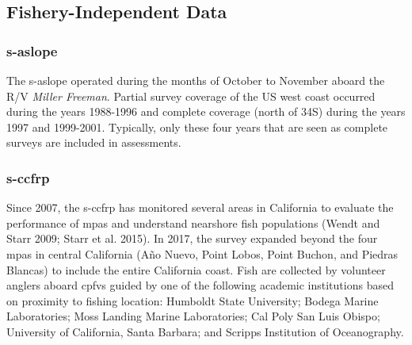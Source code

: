 \documentclass[11pt,
  english,
  a4paper,
]{article}
\begin{document}
\leavevmode\tagmcend\tagstructend


\hypertarget{fishery-independent-data-1}{%
\subsection{Fishery-Independent Data}\label{fishery-independent-data-1}}

\leavevmode\tagmcend\tagstructend


\hypertarget{section}{%
\subsubsection{\texorpdfstring{\acrlong{s-aslope}}{}}\label{section}}

\leavevmode\tagmcend\tagstructend


The \gls{s-aslope} operated during the months of October to November aboard the R/V \emph{Miller Freeman}. Partial survey coverage of the US west coast occurred during the years 1988-1996 and complete coverage (north of 34\textquotesingle S) during the years 1997 and 1999-2001. Typically, only these four years that are seen as complete surveys are included in assessments.

\leavevmode\tagmcend\tagstructend\par


\hypertarget{section-1}{%
\subsubsection{\texorpdfstring{\acrlong{s-ccfrp}}{}}\label{section-1}}

\leavevmode\tagmcend\tagstructend


Since 2007, the \Gls{s-ccfrp} has monitored several areas in California to evaluate the performance of \Gls{mpa}s and understand nearshore fish populations {(Wendt and Starr 2009; Starr et al. 2015)\leavevmode\tagmcend\tagstructend}. In 2017, the survey expanded beyond the four \Gls{mpa}s in central California (Año Nuevo, Point Lobos, Point Buchon, and Piedras Blancas) to include the entire California coast. Fish are collected by volunteer anglers aboard \Gls{cpfv}s guided by one of the following academic institutions based on proximity to fishing location: Humboldt State University; Bodega Marine Laboratories; Moss Landing Marine Laboratories; Cal Poly San Luis Obispo; University of California, Santa Barbara; and Scripps Institution of Oceanography.
\end{document}
